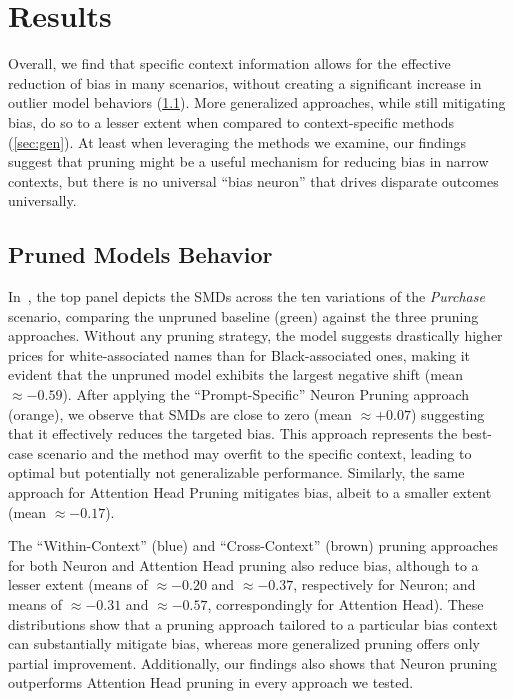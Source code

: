 \section{Results}

Overall, we find that specific context information allows for the effective reduction of bias in many scenarios, without creating a significant increase in outlier model behaviors (\cref{sec:behavior}). More generalized approaches, while still mitigating bias, do so to a lesser extent when compared to context-specific methods (\cref{sec:gen}). At least when leveraging the methods we examine, our findings suggest that pruning might be a useful mechanism for reducing bias in narrow contexts, but there is no universal ``bias neuron'' that drives disparate outcomes universally.



\subsection{Pruned Models Behavior}
\label{sec:behavior}

In~, the top panel depicts the SMDs across the ten variations of the \textit{Purchase} scenario, comparing the unpruned baseline (green) against the three pruning approaches. Without any pruning strategy, the model suggests drastically higher prices for white-associated names than for Black-associated ones, making it evident that the unpruned model exhibits the largest negative shift (mean $\approx-0.59$). After applying the ``Prompt-Specific'' Neuron Pruning approach (orange), we observe that SMDs are close to zero (mean $\approx+0.07$) suggesting that it effectively reduces the targeted bias. This approach represents the best-case scenario and the method may overfit to the specific context, leading to optimal but potentially not generalizable performance. Similarly, the same approach for Attention Head Pruning mitigates bias, albeit to a smaller extent (mean $\approx-0.17$).

The ``Within-Context'' (blue) and ``Cross-Context'' (brown) pruning approaches for both Neuron and Attention Head pruning also reduce bias, although to a lesser extent (means of $\approx-0.20$ and $\approx-0.37$, respectively for Neuron; and means of $\approx-0.31$ and $\approx-0.57$, correspondingly for Attention Head). These distributions show that a pruning approach tailored to a particular bias context can substantially mitigate bias, whereas more generalized pruning offers only partial improvement. Additionally, our findings also shows that Neuron pruning outperforms Attention Head pruning in every approach we tested.

